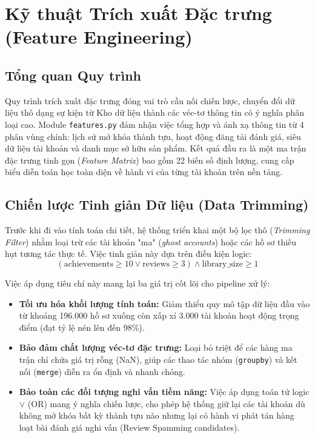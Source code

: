 \section{Kỹ thuật Trích xuất Đặc trưng (Feature Engineering)}

\subsection{Tổng quan Quy trình}
Quy trình trích xuất đặc trưng đóng vai trò cầu nối chiến lược, chuyển đổi dữ liệu thô dạng sự kiện từ Kho dữ liệu thành các véc-tơ thông tin có ý nghĩa phân loại cao. Module \texttt{features.py} đảm nhận việc tổng hợp và ánh xạ thông tin từ 4 phân vùng chính: lịch sử mở khóa thành tựu, hoạt động đăng tải đánh giá, siêu dữ liệu tài khoản và danh mục sở hữu sản phẩm. Kết quả đầu ra là một ma trận đặc trưng tinh gọn (\textit{Feature Matrix}) bao gồm 22 biến số định lượng, cung cấp biểu diễn toán học toàn diện về hành vi của từng tài khoản trên nền tảng.

\subsection{Chiến lược Tinh giản Dữ liệu (Data Trimming)}
Trước khi đi vào tính toán chi tiết, hệ thống triển khai một bộ lọc thô (\textit{Trimming Filter}) nhằm loại trừ các tài khoản "ma" (\textit{ghost accounts}) hoặc các hồ sơ thiếu hụt tương tác thực tế. Việc tinh giản này dựa trên điều kiện logic:
$$(\text{achievements} \ge 10 \lor \text{reviews} \ge 3) \land \text{library\_size} \ge 1$$

Việc áp dụng tiêu chí này mang lại ba giá trị cốt lõi cho pipeline xử lý:
\begin{itemize}
    \item \textbf{Tối ưu hóa khối lượng tính toán:} Giảm thiểu quy mô tập dữ liệu đầu vào từ khoảng 196.000 hồ sơ xuống còn xấp xỉ 3.000 tài khoản hoạt động trọng điểm (đạt tỷ lệ nén lên đến 98\%).
    \item \textbf{Bảo đảm chất lượng véc-tơ đặc trưng:} Loại bỏ triệt để các hàng ma trận chỉ chứa giá trị rỗng (NaN), giúp các thao tác nhóm (\texttt{groupby}) và kết nối (\texttt{merge}) diễn ra ổn định và nhanh chóng.
    \item \textbf{Bảo toàn các đối tượng nghi vấn tiềm năng:} Việc áp dụng toán tử logic $\lor$ (OR) mang ý nghĩa chiến lược, cho phép hệ thống giữ lại các tài khoản dù không mở khóa bất kỳ thành tựu nào nhưng lại có hành vi phát tán hàng loạt bài đánh giá nghi vấn (Review Spamming candidates).
\end{itemize}

